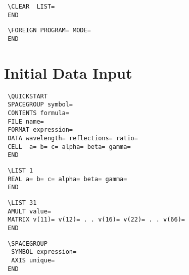\documentclass[10pt,a4paper]{report}
\begin{document}
\bigskip{}



\small\begin{verbatim}
 \CLEAR  LIST=
 END
\end{verbatim}\normalsize




\bigskip{}



\small\begin{verbatim}
 \FOREIGN PROGRAM= MODE=
 END
\end{verbatim}\normalsize


\section{Initial Data Input}


\bigskip{}



\small\begin{verbatim}
 \QUICKSTART
 SPACEGROUP symbol=
 CONTENTS formula=
 FILE name=
 FORMAT expression=
 DATA wavelength= reflections= ratio=
 CELL  a= b= c= alpha= beta= gamma=
 END
\end{verbatim}\normalsize




\bigskip{}



\small\begin{verbatim}
 \LIST 1
 REAL a= b= c= alpha= beta= gamma=
 END
\end{verbatim}\normalsize




\bigskip{}



\small\begin{verbatim}
 \LIST 31
 AMULT value=
 MATRIX v(11)= v(12)= . . v(16)= v(22)= . . v(66)=
 END
\end{verbatim}\normalsize




\bigskip{}



\small\begin{verbatim}
 \SPACEGROUP
  SYMBOL expression=
  AXIS unique=
 END
\end{verbatim}\normalsize
\end{document}
